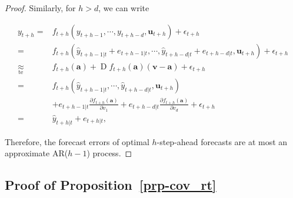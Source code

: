 \documentclass[
  11pt,
  a4paper,
]{article}
\theoremstyle{plain}
\theoremstyle{remark}
\begin{document}
\begin{proof}
Similarly, for \(h > d\), we can write

\[
\begin{aligned}
y_{t+h}
=&f_{t+h}\left(y_{t+h-1},\cdots,y_{t+h-d},\bm{u}_{t+h}\right)+\epsilon_{t+h} \\
=&f_{t+h}\left(\hat{y}_{t+h-1|t}+e_{t+h-1|t},\cdots,\hat{y}_{t+h-d|t}+e_{t+h-d|t},\bm{u}_{t+h}\right)+\epsilon_{t+h} \\
\underset{\text{te}}{\approx}&f_{t+h}\left(\bm{a}\right)+\operatorname{D}f_{t+h}\left(\bm{a}\right)\left(\bm{v}-\bm{a}\right)+
\epsilon_{t+h} \\
=&f_{t+h}\left(\hat{y}_{t+h-1|t},\cdots,\hat{y}_{t+h-d|t},\bm{u}_{t+h}\right) \\
&+e_{t+h-1|t}\frac{\partial f_{t+h}\left(\bm{a}\right)}{\partial v_1}+e_{t+h-d|t}\frac{\partial f_{t+h}\left(\bm{a}\right)}{\partial v_{d}}+\epsilon_{t+h} \\
=&\hat{y}_{t+h|t}+e_{t+h|t},
\end{aligned}
\]

Therefore, the forecast errors of optimal \(h\)-step-ahead forecasts are
at most an approximate AR(\(h-1\)) process.
\end{proof}

\subsection{\texorpdfstring{Proof of
Proposition~\ref{prp-cov_rt}}{Proof of Proposition~}}\label{sec-proof_cov_rt}
\end{document}
